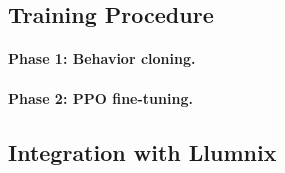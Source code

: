 \documentclass{article}
\begin{document}


\subsection{Training Procedure}

\paragraph{Phase 1: Behavior cloning.}

\paragraph{Phase 2: PPO fine-tuning.}


\subsection{Integration with Llumnix}
\end{document}
